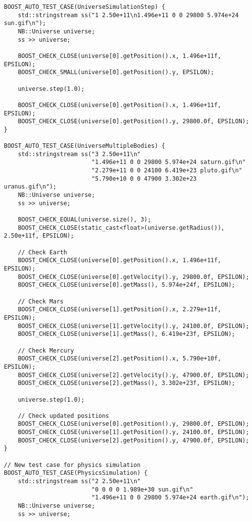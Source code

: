 \documentclass[12pt]{article}
\begin{document}
\begin{lstlisting}[style=cppcode]
BOOST_AUTO_TEST_CASE(UniverseSimulationStep) {
    std::stringstream ss("1 2.50e+11\n1.496e+11 0 0 29800 5.974e+24 sun.gif\n");
    NB::Universe universe;
    ss >> universe;

    BOOST_CHECK_CLOSE(universe[0].getPosition().x, 1.496e+11f, EPSILON);
    BOOST_CHECK_SMALL(universe[0].getPosition().y, EPSILON);

    universe.step(1.0);

    BOOST_CHECK_CLOSE(universe[0].getPosition().x, 1.496e+11f, EPSILON);
    BOOST_CHECK_CLOSE(universe[0].getPosition().y, 29800.0f, EPSILON);
}

BOOST_AUTO_TEST_CASE(UniverseMultipleBodies) {
    std::stringstream ss("3 2.50e+11\n"
                         "1.496e+11 0 0 29800 5.974e+24 saturn.gif\n"
                         "2.279e+11 0 0 24100 6.419e+23 pluto.gif\n"
                         "5.790e+10 0 0 47900 3.302e+23 uranus.gif\n");
    NB::Universe universe;
    ss >> universe;

    BOOST_CHECK_EQUAL(universe.size(), 3);
    BOOST_CHECK_CLOSE(static_cast<float>(universe.getRadius()), 2.50e+11f, EPSILON);

    // Check Earth
    BOOST_CHECK_CLOSE(universe[0].getPosition().x, 1.496e+11f, EPSILON);
    BOOST_CHECK_CLOSE(universe[0].getVelocity().y, 29800.0f, EPSILON);
    BOOST_CHECK_CLOSE(universe[0].getMass(), 5.974e+24f, EPSILON);

    // Check Mars
    BOOST_CHECK_CLOSE(universe[1].getPosition().x, 2.279e+11f, EPSILON);
    BOOST_CHECK_CLOSE(universe[1].getVelocity().y, 24100.0f, EPSILON);
    BOOST_CHECK_CLOSE(universe[1].getMass(), 6.419e+23f, EPSILON);

    // Check Mercury
    BOOST_CHECK_CLOSE(universe[2].getPosition().x, 5.790e+10f, EPSILON);
    BOOST_CHECK_CLOSE(universe[2].getVelocity().y, 47900.0f, EPSILON);
    BOOST_CHECK_CLOSE(universe[2].getMass(), 3.302e+23f, EPSILON);

    universe.step(1.0);

    // Check updated positions
    BOOST_CHECK_CLOSE(universe[0].getPosition().y, 29800.0f, EPSILON);
    BOOST_CHECK_CLOSE(universe[1].getPosition().y, 24100.0f, EPSILON);
    BOOST_CHECK_CLOSE(universe[2].getPosition().y, 47900.0f, EPSILON);
}

// New test case for physics simulation
BOOST_AUTO_TEST_CASE(PhysicsSimulation) {
    std::stringstream ss("2 2.50e+11\n"
                         "0 0 0 0 1.989e+30 sun.gif\n"
                         "1.496e+11 0 0 29800 5.974e+24 earth.gif\n");
    NB::Universe universe;
    ss >> universe;


\end{lstlisting}
\end{document}

